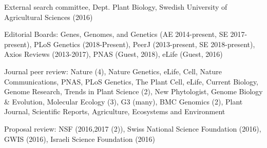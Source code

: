 \documentclass[letterpaper,10pt]{article}
\newcommand{\ignore}[1]{}
\renewenvironment{itemize}{
  \begin{list}{}{
    \setlength{\leftmargin}{1.5em}
  }
}{
  \end{list}
}
\begin{document}
\begin{itemize}
\item External search committee, Dept. Plant Biology, Swedish University of Agricultural Sciences (2016)
\item Editorial Boards: Genes, Genomes, and Genetics (AE 2014-present, SE 2017-present), PLoS Genetics (2018-Present), PeerJ (2013-present, SE 2018-present), Axios Reviews (2013-2017), PNAS (Guest, 2018), eLife (Guest, 2016)
\item Journal peer review: \ignore{6/16,7/16,12/16,2/17} Nature (4), \ignore{4/16} Nature Genetics, \ignore{10/16} eLife,  \ignore{9/17} Cell, \ignore{9/17,4/18} Nature Communications, \ignore{4/18} PNAS,  \ignore{6/16} PLoS Genetics, \ignore{6/17} The Plant Cell, \ignore{6/16} eLife, \ignore{9/15} Current Biology, \ignore{7/16} Genome Research, \ignore{9/15,6/16} Trends in Plant Science (2), \ignore{12/17} New Phytologist, \ignore{1/17} Genome Biology \& Evolution,  \ignore{11/16,2/17,5/17} Molecular Ecology (3), G3 (many), \ignore{1/17,6/17} BMC Genomics (2), \ignore{9/17} Plant Journal, \ignore{12/16} Scientific Reports, \ignore{11/17} Agriculture, Ecosystems and Environment
\item Proposal review: NSF (2016,2017 (2)), Swiss National Science Foundation (2016), GWIS (2016), Israeli Science Foundation (2016)
\end{itemize}
\end{document}
